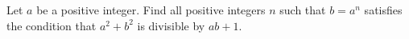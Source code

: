Let $a$ be a positive integer. Find all positive integers $n$ such that $b =
a^n$ satisfies the condition that $a^2 + b^2$ is divisible by $ab + 1$.
